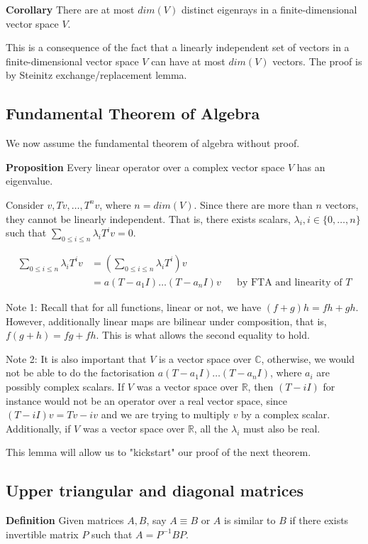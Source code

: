 \documentclass{article}
\begin{document}
\textbf{Corollary} There are at most $dim(V)$ distinct eigenrays in a finite-dimensional vector space $V$.

This is a consequence of the fact that a linearly independent set of vectors in a finite-dimensional vector space $V$ can have at most $dim(V)$ vectors.
The proof is by Steinitz exchange/replacement lemma.\\

\subsection{Fundamental Theorem of Algebra}
We now assume the fundamental theorem of algebra without proof.

\textbf{Proposition} Every linear operator over a complex vector space $V$ has an eigenvalue.

Consider $v, Tv, \dots, T^nv$, where $n=dim(V)$. Since there are more than $n$ vectors, they cannot be linearly independent. That is, there exists scalars, $\lambda_i, i\in \{0,\dots,n\}$ such that $\sum_{0\leq i\leq n}\lambda_i T^iv=0$.

\begin{align*}
	\sum_{0\leq i\leq n}\lambda_i T^iv&=(\sum_{0\leq i\leq n}\lambda_i T^i)v\\
	&=a(T-a_1I)\dots(T-a_nI)v &&\text{by FTA and linearity of $T$}
\end{align*}

Note 1: Recall that for all functions, linear or not, we have $(f+g)h=fh+gh$. However, additionally linear maps are bilinear under composition, that is, $f(g+h)=fg+fh$. This is what allows the second equality to hold.

Note 2: It is also important that $V$ is a vector space over $\mathbb{C}$, otherwise, we would not be able to do the factorisation $a(T-a_1I)\dots(T-a_nI)$, where $a_i$ are possibly complex scalars. If $V$ was a vector space over $\mathbb{R}$, then $(T-iI)$ for instance would not be an operator over a real vector space, since $(T-iI)v=Tv-iv$ and we are trying to multiply $v$ by a complex scalar.\\
Additionally, if $V$ was a vector space over $\mathbb{R}$, all the $\lambda_i$ must also be real.

This lemma will allow us to "kickstart" our proof of the next theorem.

\subsection{Upper triangular and diagonal matrices}
\textbf{Definition} Given matrices $A,B$, say $A\equiv B$ or $A$ is similar to $B$ if there exists invertible matrix $P$ such that $A=P^{-1}BP$.
\end{document}
